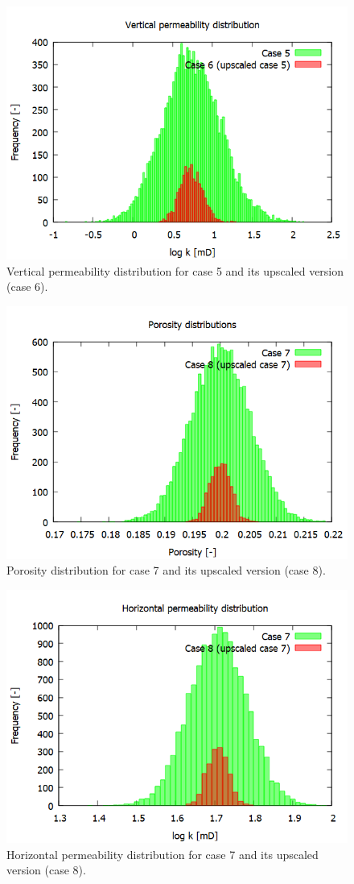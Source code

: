 \begin{figure}[H]
	\centering
	\includegraphics[width=0.82\linewidth]{Images/40}
	\caption{Vertical permeability distribution for case 5 and its upscaled version (case 6).}
	\label{fig:40}
\end{figure}
\begin{figure}[H]
	\centering
	\includegraphics[width=0.82\linewidth]{Images/43}
	\caption{Porosity distribution for case 7 and its upscaled version (case 8).}
	\label{fig:43}
\end{figure}
\begin{figure}[H]
	\centering
	\includegraphics[width=0.82\linewidth]{Images/45}
	\caption{Horizontal permeability distribution for case 7 and its upscaled version (case 8).}
	\label{fig:45}
\end{figure}
